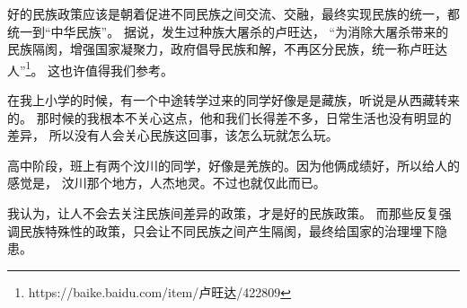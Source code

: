 好的民族政策应该是朝着促进不同民族之间交流、交融，最终实现民族的统一，都统一到“中华民族”。
据说，发生过种族大屠杀的卢旺达，
“为消除大屠杀带来的民族隔阂，增强国家凝聚力，政府倡导民族和解，不再区分民族，统一称卢旺达人”\footnote{https://baike.baidu.com/item/卢旺达/422809}。
这也许值得我们参考。

\contentsep

在我上小学的时候，有一个中途转学过来的同学好像是是藏族，听说是从西藏转来的。
那时候的我根本不关心这点，他和我们长得差不多，日常生活也没有明显的差异，
所以没有人会关心民族这回事，该怎么玩就怎么玩。

高中阶段，班上有两个汶川的同学，好像是羌族的。因为他俩成绩好，所以给人的感觉是，
汶川那个地方，人杰地灵。不过也就仅此而已。

我认为，让人不会去关注民族间差异的政策，才是好的民族政策。
而那些反复强调民族特殊性的政策，只会让不同民族之间产生隔阂，最终给国家的治理埋下隐患。

